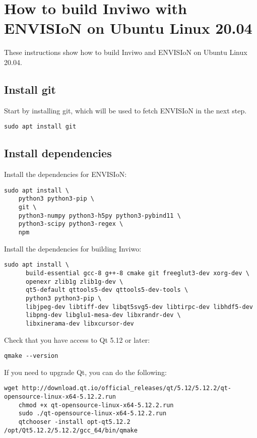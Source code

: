 \section{How to build Inviwo with ENVISIoN on Ubuntu Linux 20.04}

\label{ch:install}
These instructions show how to build Inviwo and ENVISIoN on Ubuntu Linux 20.04.

\subsection{Install git}
Start by installing git, which will be used to fetch ENVISIoN in the
next step.
\begin{lstlisting}[frame = single, breaklines=true]
    sudo apt install git
\end{lstlisting}

\subsection{Install dependencies}
Install the dependencies for ENVISIoN: 
\begin{lstlisting}[frame = single, breaklines = true]
  sudo apt install \
    python3 python3-pip \
    git \
    python3-numpy python3-h5py python3-pybind11 \
    python3-scipy python3-regex \
    npm
\end{lstlisting}

Install the dependencies for building Inviwo: 
\begin{lstlisting}[frame = single, breaklines = true]
    sudo apt install \
      build-essential gcc-8 g++-8 cmake git freeglut3-dev xorg-dev \
      openexr zlib1g zlib1g-dev \
      qt5-default qttools5-dev qttools5-dev-tools \
      python3 python3-pip \
      libjpeg-dev libtiff-dev libqt5svg5-dev libtirpc-dev libhdf5-dev
      libpng-dev libglu1-mesa-dev libxrandr-dev \
      libxinerama-dev libxcursor-dev
\end{lstlisting}

Check that you have access to Qt 5.12 or later: 
\begin{lstlisting}[frame = single, breaklines = true]
    qmake --version
\end{lstlisting}

If you need to upgrade Qt, you can do the following:
\begin{lstlisting}[frame = single, breaklines = true]
    wget http://download.qt.io/official_releases/qt/5.12/5.12.2/qt-opensource-linux-x64-5.12.2.run
    chmod +x qt-opensource-linux-x64-5.12.2.run
    sudo ./qt-opensource-linux-x64-5.12.2.run
    qtchooser -install opt-qt5.12.2 /opt/Qt5.12.2/5.12.2/gcc_64/bin/qmake
\end{lstlisting}

